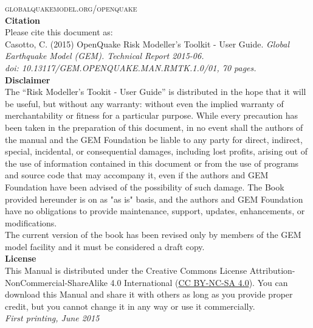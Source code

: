 \noindent \textsc{globalquakemodel.org/openquake}\\ %

\noindent
   {\textbf{Citation}} \hfill \\
   Please cite this document as:\\
   Casotto, C. (2015) OpenQuake Risk Modeller's Toolkit - User Guide. 
   \textit{Global Earthquake Model (GEM). Technical Report 2015-06.\\ 
   doi: 10.13117/GEM.OPENQUAKE.MAN.RMTK.1.0/01, 70 pages.} \hfill \\

   {\bf{Disclaimer}} \hfill \\
\noindent
   The ``Risk Modeller's Tookit - User Guide'' is distributed in the hope 
   that it will be useful, but without any warranty: without 
   even the implied warranty of merchantability or fitness for a 
   particular purpose. While every 
   precaution has been taken in the preparation of this document, in 
   no event shall the authors of the manual and the GEM Foundation be 
   liable to any party for direct, indirect, special, incidental, or 
   consequential damages, including lost profits, arising out of the 
   use of information contained in this document or from the use of 
   programs and source code that may accompany it, even if the authors 
   and GEM Foundation have been advised of the possibility of such damage. 
   The Book provided hereunder is on as "as is" basis, and the authors 
   and GEM Foundation have no obligations to provide maintenance, support,
   updates, enhancements, or modifications. 
   \hfill \\
   The current version of the book has been revised only by members of 
   the GEM model facility and it must be considered a draft copy. 
   \vspace{0.4cm} \hfill \\
   {\bf{License}} \hfill \\
   This Manual is distributed under the Creative Commons License 
   Attribution-NonCommercial-ShareAlike 4.0 International 
   (\href{http://creativecommons.org/licenses/by-nc-sa/4.0/}
   {CC BY-NC-SA 4.0}). 
   You can download this Manual and share it with 
   others as long as you provide proper credit, but you cannot change 
   it in any way or use it commercially.\hfill \\

\noindent \textit{First printing, June 2015} %


